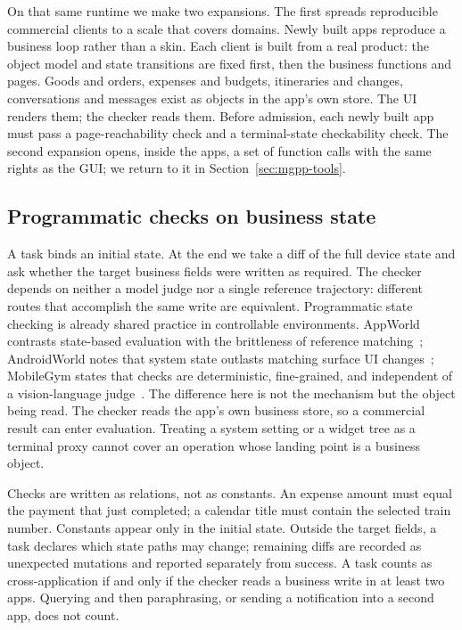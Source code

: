 On that same runtime we make two expansions. The first spreads reproducible commercial clients to a scale that covers domains. Newly built apps reproduce a business loop rather than a skin. Each client is built from a real product: the object model and state transitions are fixed first, then the business functions and pages. Goods and orders, expenses and budgets, itineraries and changes, conversations and messages exist as objects in the app's own store. The UI renders them; the checker reads them. Before admission, each newly built app must pass a page-reachability check and a terminal-state checkability check. The second expansion opens, inside the apps, a set of function calls with the same rights as the GUI; we return to it in Section~\ref{sec:mgpp-tools}.

\subsection{Programmatic checks on business state}
\label{sec:mgpp-check}

A task binds an initial state. At the end we take a diff of the full device state and ask whether the target business fields were written as required. The checker depends on neither a model judge nor a single reference trajectory: different routes that accomplish the same write are equivalent. Programmatic state checking is already shared practice in controllable environments. AppWorld contrasts state-based evaluation with the brittleness of reference matching~\citep{trivedi2024appworld}; AndroidWorld notes that system state outlasts matching surface UI changes~\citep{rawles2025androidworld}; MobileGym states that checks are deterministic, fine-grained, and independent of a vision-language judge~\citep{wu2026mobilegym}. The difference here is not the mechanism but the object being read. The checker reads the app's own business store, so a commercial result can enter evaluation. Treating a system setting or a widget tree as a terminal proxy cannot cover an operation whose landing point is a business object.

Checks are written as relations, not as constants. An expense amount must equal the payment that just completed; a calendar title must contain the selected train number. Constants appear only in the initial state. Outside the target fields, a task declares which state paths may change; remaining diffs are recorded as unexpected mutations and reported separately from success. A task counts as cross-application if and only if the checker reads a business write in at least two apps. Querying and then paraphrasing, or sending a notification into a second app, does not count.

